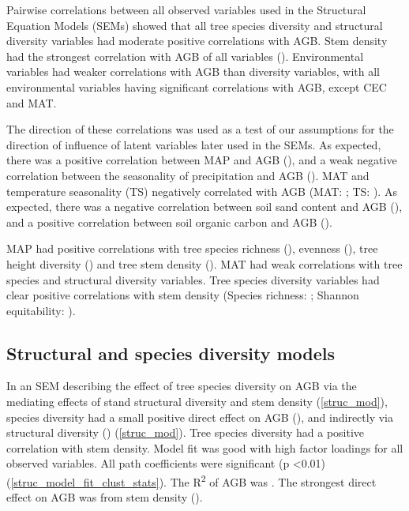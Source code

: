 \documentclass[11pt,a4paper]{article}
\begin{document}
Pairwise correlations between all observed variables used in the Structural Equation Models (SEMs) showed that all tree species diversity and structural diversity variables had moderate positive correlations with AGB. Stem density had the strongest correlation with AGB of all variables  (\ccib{}). Environmental variables had weaker correlations with AGB than diversity variables, with all environmental variables having significant correlations with AGB, except CEC and MAT.

The direction of these correlations was used as a test of our assumptions for the direction of influence of latent variables later used in the SEMs. As expected, there was a positive correlation between MAP and AGB (\ccmb{}), and a weak negative correlation between the seasonality of precipitation and AGB (\ccmcb{}). MAT and temperature seasonality (TS)   negatively correlated  with AGB (MAT: \cctb{}; TS: \cctcb{}). As expected, there was a negative correlation between soil sand content and AGB (\ccsb{}), and a positive correlation between soil organic carbon and AGB (\ccob{}). 

MAP had positive correlations with tree species richness (\ccms{}), evenness (\ccme{}), tree height diversity (\ccmh{}) and tree stem density (\ccmi{}). MAT had weak correlations with tree species and structural diversity variables. Tree species diversity variables had clear positive correlations with stem density (Species richness: \ccsi{}; Shannon equitability: \ccei{}). 

\subsection{Structural and species diversity models}

In an SEM describing the effect of tree species diversity on AGB via the mediating effects of stand structural diversity and stem density (\autoref{struc_mod}), species diversity had a small positive direct effect on AGB (\strucdb{}), and indirectly via structural diversity (\strucdsb{}) (\autoref{struc_mod}). Tree species diversity had a positive correlation with stem density. Model fit was good with high factor loadings for all observed variables. All path coefficients were significant (p <0.01) (\autoref{struc_model_fit_clust_stats}). The R\textsuperscript{2} of AGB was \strucrsq{}. The strongest direct effect on AGB was from stem density (\strucsib{}).
\end{document}
